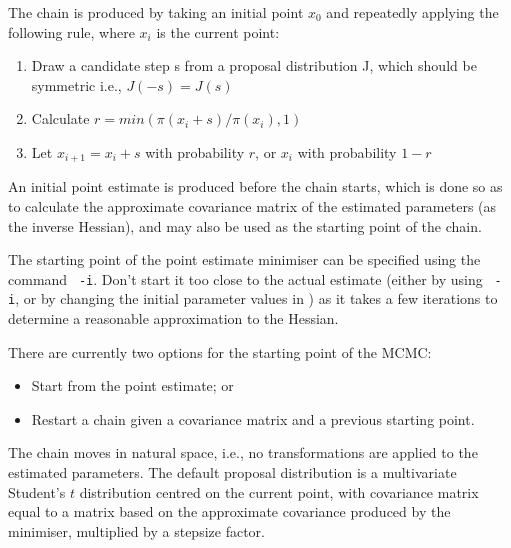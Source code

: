The chain is produced by taking an initial point $x_0$ and repeatedly applying the following rule, where $x_i$ is the current point:

\begin{enumerate}
\item Draw a candidate step s from a proposal distribution J, which should be symmetric i.e., $J(-s)=J(s)$
\item Calculate $r=min(\pi(x_i+s)/\pi(x_i),1)$
\item Let $x_{i+1}=x_i+s$ with probability $r$, or $x_i$ with probability $1-r$
\end{enumerate}

An initial point estimate is produced before the chain starts, which is done so as to calculate the approximate covariance matrix of the estimated parameters (as the inverse Hessian), and may also be used as the starting point of the chain.

The starting point of the point estimate minimiser can be specified using the command \texttt{\cname\ -i}. Don't start it too close to the actual estimate (either by using \texttt{\cname\ -i}, or by changing the initial parameter values in \config) as it takes a few iterations to determine a reasonable approximation to the Hessian.

There are currently two options for the starting point of the MCMC:

\begin{itemize}
\item Start from the point estimate; or
\item Restart a chain given a covariance matrix and a previous starting point.
\end{itemize}

The chain moves in natural space, i.e., no transformations are applied to the estimated parameters. The default proposal distribution is a multivariate Student's $t$ distribution centred on the current point, with covariance matrix equal to a matrix based on the approximate covariance produced by the minimiser, multiplied by a stepsize factor.

